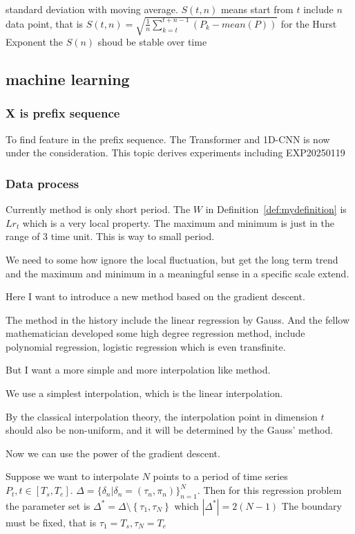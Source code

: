 \documentclass{article}
\theoremstyle{definition} %
\begin{document}
standard deviation with moving average.
$S(t,n)$ means start from
$t$ include $n$ data point,
that is
$S(t,n)=\sqrt{\frac{1}{n}\sum_{k=t}^{t+n-1}
        \left(P_k-mean(P)\right)}$
for the Hurst Exponent the $S(n)$ shoud be
stable over time

\subsection{machine learning}
\subsubsection{X is prefix sequence}
To find feature in the prefix sequence. The
Transformer and 1D-CNN is now under
the consideration.
This topic derives experiments including
EXP20250119

\subsubsection{Data process}
Currently method is only short period.
The $W$ in Definition~\ref{def:mydefinition}
is $Lr_t$ which is a very local property.
The maximum and minimum is just in the range
of $3$ time unit. This is way to small period.

We need to some how ignore the local fluctuation,
but get the long term trend and the maximum
and minimum in a meaningful sense in
a specific scale extend.

Here I want to introduce a new method based
on the gradient descent.

The method in the history include the
linear regression by Gauss. And the fellow
mathematician developed some high degree
regression method, include polynomial regression,
logistic regression which is even transfinite.

But I want a more simple and more interpolation
like method.

We use a simplest interpolation, which is
the linear interpolation.

By the classical interpolation theory,
the interpolation point in dimension
$t$ should also be non-uniform, and it
will be determined by the Gauss' method.

Now we can use the power of the gradient
descent.

Suppose we want to interpolate $N$ points
to a period of time series
$P_t,t\in\left[T_s,T_e\right]$.
$\Delta=\{\delta_n|\delta_n=
    (\tau_n,\pi_n)\}_{n=1}^N$.
Then for this regression problem the
parameter set is
$\Delta^*=\Delta\setminus\left\{\tau_1,\tau_N\right\}$ which
$
    \left|
    \Delta^*
    \right|=2\left(N-1\right)
$
The boundary must be fixed, that is
$\tau_1=T_s,\tau_N=T_e$
\end{document}
